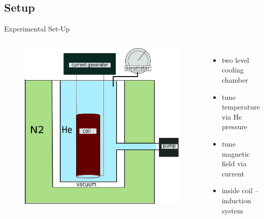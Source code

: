 \documentclass{beamer}
\begin{document}
\subsection{Setup} %
\begin{frame}{Experimental Set-Up}
\begin{columns}
\begin{figure}
\centering
\includegraphics[height=0.6\textheight]{img/Zeichnung.pdf}
\end{figure}
\begin{itemize}[<+->]
\item two level cooling chamber
\item tune temperature via He pressure
\item tune magnetic field via current
\item inside coil -- induction system
\end{itemize}
\end{columns}

\end{frame}
\end{document}
